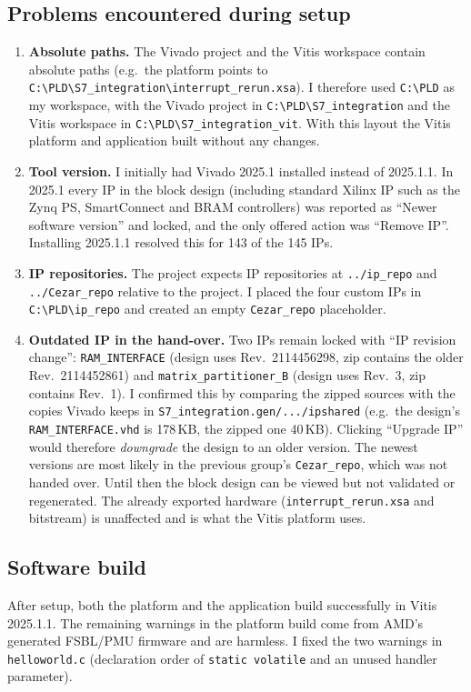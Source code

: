 \documentclass[11pt,a4paper]{article}
\newcommand{\code}[1]{\texttt{#1}}
\begin{document}
\subsection{Problems encountered during setup}
\begin{enumerate}
  \item \textbf{Absolute paths.} The Vivado project and the Vitis workspace contain absolute paths (e.g.\ the platform points to \code{C:\textbackslash PLD\textbackslash S7\_integration\textbackslash interrupt\_rerun.xsa}). I therefore used \code{C:\textbackslash PLD} as my workspace, with the Vivado project in \code{C:\textbackslash PLD\textbackslash S7\_integration} and the Vitis workspace in \code{C:\textbackslash PLD\textbackslash S7\_integration\_vit}. With this layout the Vitis platform and application built without any changes.
  \item \textbf{Tool version.} I initially had Vivado 2025.1 installed instead of 2025.1.1. In 2025.1 every IP in the block design (including standard Xilinx IP such as the Zynq PS, SmartConnect and BRAM controllers) was reported as ``Newer software version'' and locked, and the only offered action was ``Remove IP''. Installing 2025.1.1 resolved this for 143 of the 145 IPs.
  \item \textbf{IP repositories.} The project expects IP repositories at \code{../ip\_repo} and \code{../Cezar\_repo} relative to the project. I placed the four custom IPs in \code{C:\textbackslash PLD\textbackslash ip\_repo} and created an empty \code{Cezar\_repo} placeholder.
  \item \textbf{Outdated IP in the hand-over.} Two IPs remain locked with ``IP revision change'': \code{RAM\_INTERFACE} (design uses Rev.~2114456298, zip contains the older Rev.~2114452861) and \code{matrix\_partitioner\_B} (design uses Rev.~3, zip contains Rev.~1). I confirmed this by comparing the zipped sources with the copies Vivado keeps in \code{S7\_integration.gen/.../ipshared} (e.g.\ the design's \code{RAM\_INTERFACE.vhd} is 178\,KB, the zipped one 40\,KB). Clicking ``Upgrade IP'' would therefore \emph{downgrade} the design to an older version. The newest versions are most likely in the previous group's \code{Cezar\_repo}, which was not handed over. Until then the block design can be viewed but not validated or regenerated. The already exported hardware (\code{interrupt\_rerun.xsa} and bitstream) is unaffected and is what the Vitis platform uses.
\end{enumerate}

\subsection{Software build}
After setup, both the platform and the application build successfully in Vitis 2025.1.1. The remaining warnings in the platform build come from AMD's generated FSBL/PMU firmware and are harmless. I fixed the two warnings in \code{helloworld.c} (declaration order of \code{static volatile} and an unused handler parameter).
\end{document}
